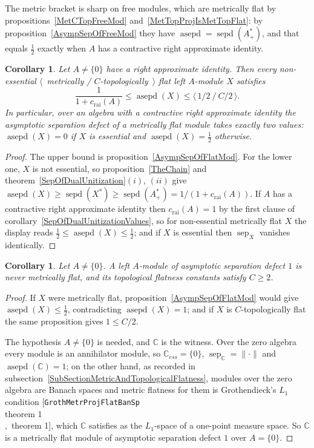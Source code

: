 \documentclass[11pt]{article}
\theoremstyle{plain}
\newtheorem{corollary}[theorem]{Corollary}
\theoremstyle{definition}
\DeclareMathOperator{\sep}{sep}
\DeclareMathOperator{\sepd}{sepd}
\DeclareMathOperator{\asepd}{asepd}
\newcommand{\crai}{c_{\mathrm{rai}}}
\DeclareRobustCommand{\cite}[2][]{[\texttt{#2}\ifx\\#1\\\else,~#1\fi]}
\begin{document}
The metric bracket is sharp on free modules, which are metrically flat by
propositions~\ref{MetCTopFreeMod} and~\ref{MetTopProjIsMetTopFlat}: by
proposition~\ref{AsympSepOfFreeMod} they have $\asepd=\sepd(A_+^*)$, and that
equals $\tfrac{1}{2}$ exactly when $A$ has a contractive right approximate
identity.

\begin{corollary}\label{AsympSepQuantization}
Let $A\neq \{0 \}$ have a right approximate identity. Then every non-essential
$\langle$~metrically / $C$-topologically~$\rangle$ flat left $A$-module $X$
satisfies
\[
\frac{1}{1+\crai(A)}\leq\asepd(X)\leq\langle\,1/2\ /\ C/2\,\rangle .
\]
In particular, over an algebra with a contractive right approximate identity the
asymptotic separation defect of a metrically flat module takes exactly two
values: $\asepd(X)=0$ if $X$ is essential and $\asepd(X)=\tfrac{1}{2}$ otherwise.
\end{corollary}

\begin{proof}
The upper bound is proposition~\ref{AsympSepOfFlatMod}. For the lower one, $X$ is
not essential, so proposition~\ref{TheChain} and
theorem~\ref{SepOfDualUnitization}$(i)$, $(ii)$ give
$\asepd(X)\geq\sepd(X^*)\geq\sepd(A_+^*)=1/(1+\crai(A))$. If $A$ has a
contractive right approximate identity then $\crai(A)=1$ by the first clause of
corollary~\ref{SepOfDualUnitizationValues}, so for non-essential metrically flat
$X$ the display reads $\tfrac{1}{2}\leq\asepd(X)\leq\tfrac{1}{2}$; and if $X$ is
essential then $\sep_X$ vanishes identically.
\end{proof}

\begin{corollary}\label{MaxAsympSepImpliesNotFlat}
Let $A\neq \{0 \}$. A left $A$-module of asymptotic separation defect $1$ is
never metrically flat, and its topological flatness constants satisfy $C\geq 2$.
\end{corollary}

\begin{proof}
If $X$ were metrically flat, proposition~\ref{AsympSepOfFlatMod} would give
$\asepd(X)\leq\tfrac{1}{2}$, contradicting $\asepd(X)=1$; and if $X$ is
$C$-topologically flat the same proposition gives $1\leq C/2$.

The hypothesis $A\neq \{0 \}$ is needed, and $\mathbb{C}$ is the witness. Over
the zero algebra every module is an annihilator module, so
$\mathbb{C}_{ess}= \{0 \}$, $\sep_{\mathbb{C}}=\lVert\cdot\rVert$ and
$\asepd(\mathbb{C})=1$; on the other hand, as recorded in
subsection~\ref{SubSectionMetricAndTopologicalFlatness}, modules over the zero
algebra are Banach spaces and metric flatness for them is Grothendieck's
$L_1$ condition \cite[theorem 1]{GrothMetrProjFlatBanSp}, which $\mathbb{C}$
satisfies as the $L_1$-space of a one-point measure space. So $\mathbb{C}$ is a
metrically flat module of asymptotic separation defect $1$ over $A= \{0 \}$.
\end{proof}
\end{document}

